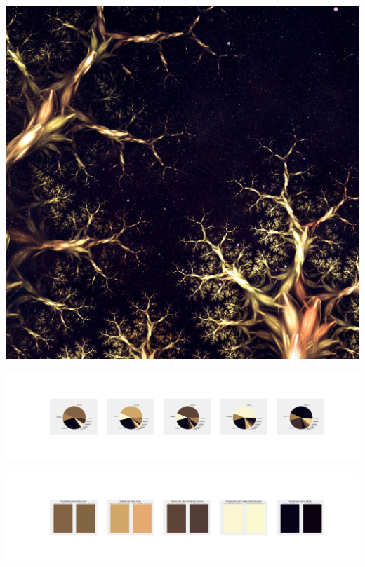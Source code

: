 \documentclass[11pt]{article}
\begin{document}
\begin{landscape}
    \begin{center}
    \includegraphics[width=\textwidth]{./nbimg/file (377).jpg}
    \end{center}

    \begin{center}
    \includegraphics[width=250mm]{./nbimg/pie-308.jpg}
    \end{center}

    \begin{center}
    \includegraphics[width=250mm]{./nbimg/peak-308.jpg}
    \end{center}
    


\end{landscape}
\end{document}

